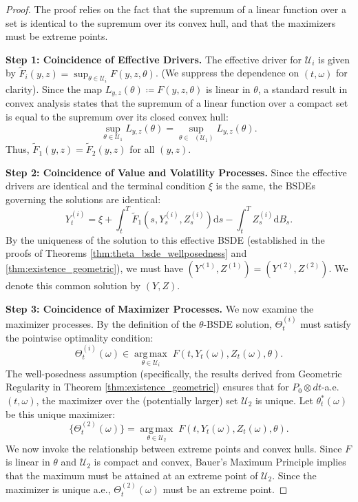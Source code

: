 \documentclass[12pt, letterpaper]{amsart}
\newcommand{\Ucal}{\mathcal{U}}
\newcommand{\dd}{\mathrm{d}}
\DeclareMathOperator*{\argmax}{arg\,max}
\DeclareMathOperator*{\overlineconv}{\overline{conv}}
\theoremstyle{plain}
\theoremstyle{definition}
\theoremstyle{remark}
\numberwithin{equation}{section} %
\begin{document}
\begin{proof}
The proof relies on the fact that the supremum of a linear function over a set is identical to the supremum over its convex hull, and that the maximizers must be extreme points.

\vspace{1ex}
\noindent\textbf{Step 1: Coincidence of Effective Drivers.}
The effective driver for \(\Ucal_i\) is given by \(\tilde{F}_i(y,z) = \sup_{\theta \in \Ucal_i} F(y,z,\theta)\). (We suppress the dependence on \((t,\omega)\) for clarity). Since the map \(L_{y,z}(\theta) \coloneqq F(y,z,\theta)\) is linear in \(\theta\), a standard result in convex analysis \cite{Rockafellar1970} states that the supremum of a linear function over a compact set is equal to the supremum over its closed convex hull:
\[ \sup_{\theta \in \Ucal_1} L_{y,z}(\theta) = \sup_{\theta \in \overlineconv(\Ucal_1)} L_{y,z}(\theta). \]
Thus, \(\tilde{F}_1(y,z) = \tilde{F}_2(y,z)\) for all \((y,z)\).

\vspace{1ex}
\noindent\textbf{Step 2: Coincidence of Value and Volatility Processes.}
Since the effective drivers are identical and the terminal condition \(\xi\) is the same, the BSDEs governing the solutions are identical:
\[ Y^{(i)}_t = \xi + \int_t^T \tilde{F}_1(s, Y^{(i)}_s, Z^{(i)}_s) \dd s - \int_t^T Z^{(i)}_s \dd B_s. \]
By the uniqueness of the solution to this effective BSDE (established in the proofs of Theorems \ref{thm:theta_bsde_wellposedness} and \ref{thm:existence_geometric}), we must have \((Y^{(1)}, Z^{(1)}) = (Y^{(2)}, Z^{(2)})\). We denote this common solution by \((Y, Z)\).

\vspace{1ex}
\noindent\textbf{Step 3: Coincidence of Maximizer Processes.}
We now examine the maximizer processes. By the definition of the \(\theta\)-BSDE solution, \(\Theta^{(i)}_t\) must satisfy the pointwise optimality condition:
\[ \Theta^{(i)}_t(\omega) \in \underset{\theta \in \Ucal_i}{\argmax} \; F(t, Y_t(\omega), Z_t(\omega), \theta). \]
The well-posedness assumption (specifically, the results derived from Geometric Regularity in Theorem \ref{thm:existence_geometric}) ensures that for \(P_0 \otimes dt\)-a.e. \((t,\omega)\), the maximizer over the (potentially larger) set \(\Ucal_2\) is unique. Let \(\theta^*_t(\omega)\) be this unique maximizer:
\[ \{\Theta^{(2)}_t(\omega)\} = \underset{\theta \in \Ucal_2}{\argmax} \; F(t, Y_t(\omega), Z_t(\omega), \theta). \]
We now invoke the relationship between extreme points and convex hulls. Since \(F\) is linear in \(\theta\) and \(\Ucal_2\) is compact and convex, Bauer's Maximum Principle implies that the maximum must be attained at an extreme point of \(\Ucal_2\). Since the maximizer is unique a.e., \(\Theta^{(2)}_t(\omega)\) must be an extreme point.


\end{proof}
\end{document}
